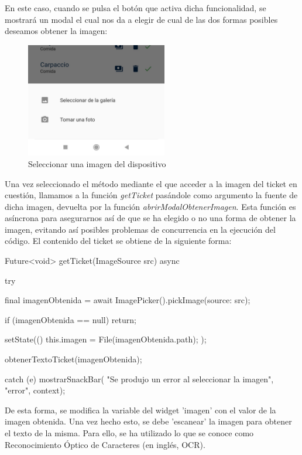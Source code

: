 \documentclass{article}
\begin{document}
En este caso, cuando se pulsa el botón que activa dicha funcionalidad, se mostrará un modal el cual nos da a elegir de cual de las dos formas posibles deseamos obtener la imagen:

\begin{figure}[h]
    \centering
    \includegraphics[width=0.55\textwidth]{imagenes/pantallas/modal_obtener_imagen.jpg}
    \caption{Seleccionar una imagen del dispositivo}
    \label{fig:modal}
\end{figure}

Una vez seleccionado el método mediante el que acceder a la imagen del ticket en cuestión, llamamos a la función \textit{getTicket} pasándole como argumento la fuente de dicha imagen, devuelta por la función \textit{abrirModalObtenerImagen}. Esta función es asíncrona para asegurarnos así de que se ha elegido o no una forma de obtener la imagen, evitando así posibles problemas de concurrencia en la ejecución del código. El contenido del ticket se obtiene de la siguiente forma:

\vspace{0.5cm}
\begin{codigo}
Future<void> getTicket(ImageSource src) async
{
    try {
        final imagenObtenida = await ImagePicker().pickImage(source: src);
        
        if (imagenObtenida == null) return;
        
        setState(() {
            this.imagen = File(imagenObtenida.path); 
        });
        
        obtenerTextoTicket(imagenObtenida);
    } catch (e) {
          mostrarSnackBar( "Se produjo un error al seleccionar la imagen",
          "error", context);
    }
}
\end{codigo}

De esta forma, se modifica la variable del widget 'imagen' con el valor de la imagen obtenida. Una vez hecho esto, se debe 'escanear' la imagen para obtener el texto de la misma. Para ello, se ha utilizado lo que se conoce como Reconocimiento Óptico de Caracteres \cite{OCR} (en inglés, OCR).
\end{document}
